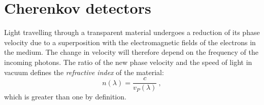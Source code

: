 \section{Cherenkov detectors}
\label{sec:wch}


Light travelling through a transparent material undergoes a reduction of its phase velocity %
due to a superposition with the electromagnetic fields of the electrons in the medium. %
The change in velocity will therefore depend on the frequency of the incoming photons.
The ratio of the new phase velocity and the speed of light in vacuum defines the \emph{refractive index} %
of the material:
\begin{equation}
	\label{eq:ref_index}
	n(\lambda) = \frac{c}{v_P(\lambda)}\ ,
\end{equation}
which is greater than one by definition.

